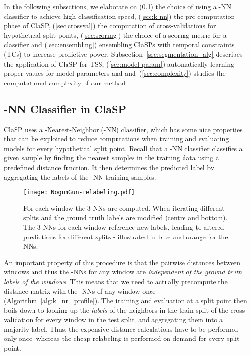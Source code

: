 \documentclass[pdflatex,sn-basic]{sn-jnl}
\begin{document}
In the following subsections, we elaborate on (\ref{sec:classifier}) the choice of using a -NN classifier to achieve high classification speed, (\ref{sec:k-nn}) the pre-computation phase of ClaSP, (\ref{sec:crossval}) the computation of cross-validations for hypothetical split points, (\ref{sec:scoring}) the choice of a scoring metric for a classifier and (\ref{sec:ensembling}) ensembling ClaSPs with temporal constraints (TCs) to increase predictive power. Subsection~\ref{sec:segmentation_alg} describes the application of ClaSP for TSS, (\ref{sec:model-param}) automatically learning proper values for model-parameters  and  and~(\ref{sec:complexity}) studies the computational complexity of our method.

\subsection{-NN Classifier in ClaSP} \label{sec:classifier}

ClaSP uses a -Nearest-Neighbor (-NN) classifier, which has some nice properties that can be exploited to reduce computations when training and evaluating models for every hypothetical split point. Recall that a -NN classifier classifies a given sample by finding the  nearest samples in the training data using a predefined distance function. It then determines the predicted label by aggregating the labels of the -NN training samples. 

\begin{figure}[t]
	\texttt{[image: NogunGun-relabeling.pdf]}
	\caption{For each window the 3-NNs are computed. When iterating different splits  and  the ground truth labels  are modified (centre and bottom). The 3-NNs for each window reference new labels, leading to altered predictions for different splits - illustrated in blue and orange for the NNs.
	\label{fig:clasp_relabeling}
	}
\end{figure}

An important property of this procedure is that the pairwise distances between windows and thus the -NNs for any window are \emph{independent of the ground truth labels of the windows}. This means that we need to actually precompute the distance matrix with the -NNs of any window once (Algorithm~\ref{alg:k_nn_profile}). The training and evaluation at a split point  then boils down to looking up the \emph{labels} of the  neighbors in the train split of the cross-validation for every window in the test split, and aggregating them into a majority label. Thus, the expensive distance calculations have to be performed only once, whereas the cheap relabeling is performed on demand for every split point.
\end{document}
